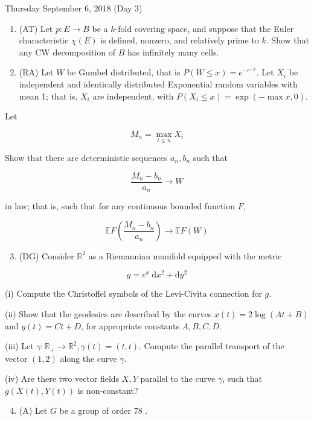 \documentclass[10pt]{article}
\begin{document}
Thursday September 6, 2018 (Day 3)

\begin{enumerate}
  \item (AT) Let $p: E \rightarrow B$ be a $k$-fold covering space, and suppose that the Euler characteristic $\chi(E)$ is defined, nonzero, and relatively prime to $k$. Show that any $\mathrm{CW}$ decomposition of $B$ has infinitely many cells.

  \item (RA) Let $W$ be Gumbel distributed, that is $P(W \leq x)=e^{-e^{-x}}$. Let $X_{i}$ be independent and identically distributed Exponential random variables with mean 1; that is, $X_{i}$ are independent, with $P\left(X_{i} \leq x\right)=\exp (-\max x, 0)$.

\end{enumerate}

Let

$$
M_{n}=\max _{i \leq n} X_{i}
$$

Show that there are deterministic sequences $a_{n}, b_{n}$ such that

$$
\frac{M_{n}-b_{n}}{a_{n}} \rightarrow W
$$

in law; that is, such that for any continuous bounded function $F$,

$$
\mathbb{E} F\left(\frac{M_{n}-b_{n}}{a_{n}}\right) \rightarrow \mathbb{E} F(W)
$$

\begin{enumerate}
  \setcounter{enumi}{2}
  \item (DG) Consider $\mathbb{R}^{2}$ as a Riemannian manifold equipped with the metric
\end{enumerate}

$$
g=e^{x} \mathrm{~d} x^{2}+\mathrm{d} y^{2}
$$

(i) Compute the Christoffel symbols of the Levi-Civita connection for $g$.

(ii) Show that the geodesics are described by the curves $x(t)=2 \log (A t+B)$ and $y(t)=C t+D$, for appropriate constants $A, B, C, D$.

(iii) Let $\gamma: \mathbb{R}_{+} \rightarrow \mathbb{R}^{2}, \gamma(t)=(t, t)$. Compute the parallel transport of the vector $(1,2)$ along the curve $\gamma$.

(iv) Are there two vector fields $X, Y$ parallel to the curve $\gamma$, such that $g(X(t), Y(t))$ is non-constant?

\begin{enumerate}
  \setcounter{enumi}{3}
  \item (A) Let $G$ be a group of order 78 .
\end{enumerate}
\end{document}

